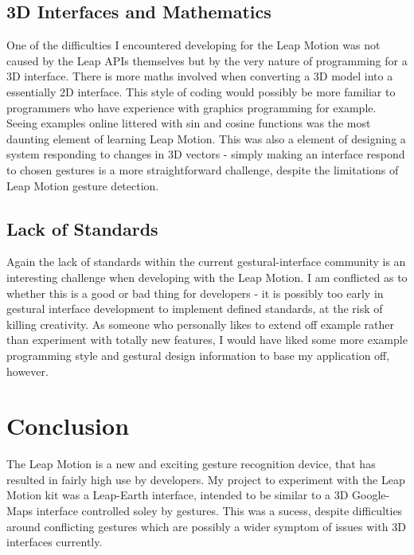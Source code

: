 \documentclass{sigplanconf}
\begin{document}

\subsection{3D Interfaces and Mathematics}

One of the difficulties I encountered developing for the Leap Motion was not caused by the Leap APIs themselves but by the very nature of programming for a 3D interface. There is more maths involved when converting a 3D model into a essentially 2D interface. This style of coding would possibly be more familiar to programmers who have experience with graphics programming for example. Seeing examples online littered with sin and cosine functions was the most daunting element of learning Leap Motion. This was also a element of designing a system responding to changes in 3D vectors - simply making an interface respond to chosen gestures is a more straightforward challenge, despite the limitations of Leap Motion gesture detection.

\subsection{Lack of Standards}

Again the lack of standards within the current gestural-interface community is an interesting challenge when developing with the Leap Motion. I am conflicted as to whether this is a good or bad thing for developers - it is possibly too early in gestural interface development to implement defined standards, at the risk of killing creativity. As someone who personally likes to extend off example rather than experiment with totally new features, I would have liked some more example programming style and gestural design information to base my application off, however. 

\section{Conclusion}

The Leap Motion is a new and exciting gesture recognition device, that has resulted in fairly high use by developers. My project to experiment with the Leap Motion kit was a Leap-Earth interface, intended to be similar to a 3D Google-Maps interface controlled soley by gestures. This was a sucess, despite difficulties around conflicting gestures which are possibly a wider symptom of issues with 3D interfaces currently. 
\end{document}
